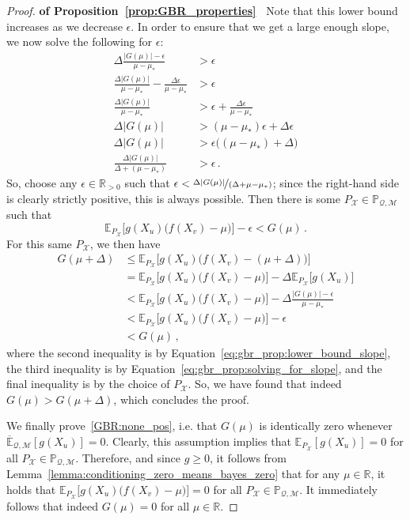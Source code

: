 \documentclass[twoside,11pt]{article}
\newcommand{\reals}{\mathbb{R}}
\newcommand{\realspos}{\reals_{>0}}
\newcommand{\states}{\mathcal{X}}
\newcommand{\uexp}{\overline{\mathbb{E}}_{\rateset,\mathcal{M}}}
\newcommand{\rateset}{\mathcal{Q}}
\newcommand{\abs}[1]{\left\vert #1 \right\vert}
\begin{document}
\begin{proof}{\bf of Proposition~\ref{prop:GBR_properties}~}
Note that this lower bound increases as we decrease $\epsilon$. In order to ensure that we get a large enough slope, we now solve the following for $\epsilon$:
\begin{equation}
\begin{split}\label{eq:gbr_prop:solving_for_slope}
\Delta\frac{\abs{G(\mu)}-\epsilon}{\mu-\mu_*} &> \epsilon \\
\frac{\Delta\abs{G(\mu)}}{\mu-\mu_*} - \frac{\Delta\epsilon}{\mu-\mu_*} &> \epsilon \\
\frac{\Delta\abs{G(\mu)}}{\mu-\mu_*} &> \epsilon + \frac{\Delta\epsilon}{\mu-\mu_*} \\
\Delta\abs{G(\mu)} &> (\mu-\mu_*)\epsilon + \Delta\epsilon \\
\Delta\abs{G(\mu)} &> \epsilon\bigl((\mu-\mu_*) + \Delta\bigr) \\
\frac{\Delta\abs{G(\mu)}}{\Delta + (\mu-\mu_*)} &> \epsilon\,.
\end{split}
\end{equation}
So, choose any $\epsilon\in\realspos$ such that $\epsilon< \nicefrac{\Delta\abs{G(\mu)}}{(\Delta + \mu-\mu_*)}$; since the right-hand side is clearly strictly positive, this is always possible. Then there is some $P_\states\in\mathbb{P}_{\rateset,\mathcal{M}}$ such that
\begin{equation*}
\mathbb{E}_{P_\states}\bigl[g(X_u)\bigl(f(X_v)-\mu\bigr)\bigr] - \epsilon < G(\mu)\,.
\end{equation*}
For this same $P_\states$, we then have
\begin{align*}
G(\mu+\Delta) &\leq \mathbb{E}_{P_\states}\bigl[g(X_u)\bigl(f(X_v)-(\mu+\Delta)\bigr)\bigr] \\
 &= \mathbb{E}_{P_\states}\bigl[g(X_u)\bigl(f(X_v)-\mu\bigr)\bigr] - \Delta\mathbb{E}_{P_\states}\bigl[g(X_u)\bigr] \\
 &< \mathbb{E}_{P_\states}\bigl[g(X_u)\bigl(f(X_v)-\mu\bigr)\bigr] - \Delta\frac{\abs{G(\mu)}-\epsilon}{\mu-\mu_*} \\
 &< \mathbb{E}_{P_\states}\bigl[g(X_u)\bigl(f(X_v)-\mu\bigr)\bigr] - \epsilon \\
 &< G(\mu)\,,
\end{align*}
where the second inequality is by Equation~\eqref{eq:gbr_prop:lower_bound_slope}, the third inequality is by Equation~\eqref{eq:gbr_prop:solving_for_slope}, and the final inequality is by the choice of $P_\states$. So, we have found that indeed $G(\mu)>G(\mu+\Delta)$, which concludes the proof.

We finally prove~\ref{GBR:none_pos}, i.e. that $G(\mu)$ is identically zero whenever $\uexp[g(X_u)]=0$. Clearly, this assumption implies that $\mathbb{E}_{P_\states}[g(X_u)]=0$ for all $P_\states\in\mathbb{P}_{\rateset,\mathcal{M}}$. Therefore, and since $g\geq 0$, it follows from Lemma~\ref{lemma:conditioning_zero_means_bayes_zero} that for any $\mu\in\reals$, it holds that $\mathbb{E}_{P_\states}\bigl[g(X_u)\bigl(f(X_v) - \mu\bigr)\bigr]=0$ for all $P_\states\in\mathbb{P}_{\rateset,\mathcal{M}}$. It immediately follows that indeed $G(\mu)=0$ for all $\mu\in\reals$.
\end{proof}
\end{document}
